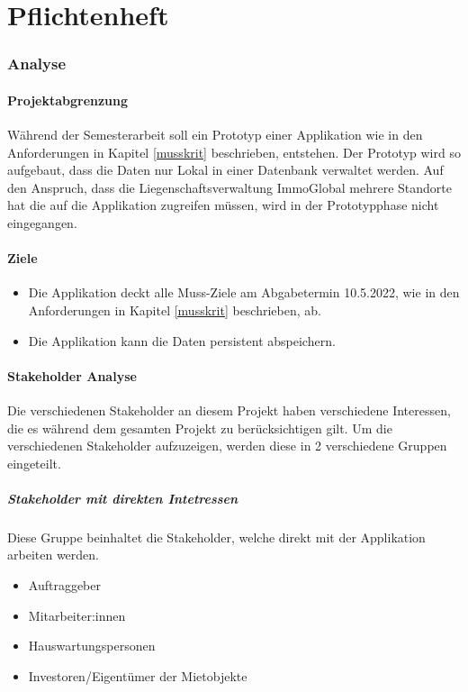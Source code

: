 \part{Pflichtenheft}
\section{Analyse}
\subsection{Projektabgrenzung}
Während der Semesterarbeit soll ein Prototyp einer Applikation wie in den Anforderungen in Kapitel \ref{musskrit} beschrieben, entstehen. Der Prototyp wird so aufgebaut, dass die Daten nur Lokal in einer Datenbank verwaltet werden. Auf den Anspruch, dass die Liegenschaftsverwaltung ImmoGlobal mehrere Standorte hat die auf die Applikation zugreifen müssen, wird in der Prototypphase nicht eingegangen.

\subsection{Ziele}
\begin{itemize}
    \item Die Applikation deckt alle Muss-Ziele am Abgabetermin 10.5.2022, wie in den Anforderungen in Kapitel \ref{musskrit} beschrieben, ab.
    \item Die Applikation kann die Daten persistent abspeichern.
\end{itemize}

\subsection{Stakeholder Analyse}
Die verschiedenen Stakeholder an diesem Projekt haben verschiedene Interessen, die es während dem gesamten Projekt zu berücksichtigen gilt.
Um die verschiedenen Stakeholder aufzuzeigen, werden diese in 2 verschiedene Gruppen eingeteilt.

\subsubsection{Stakeholder mit direkten Intetressen}
Diese Gruppe beinhaltet die Stakeholder, welche direkt mit der Applikation arbeiten werden.

\begin{itemize}
    \item Auftraggeber
    \item Mitarbeiter:innen
    \item Hauswartungspersonen
    \item Investoren/Eigentümer der Mietobjekte
\end{itemize}

